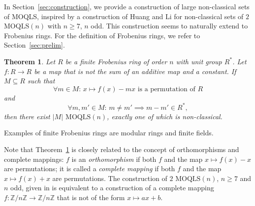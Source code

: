 \documentclass[a4paper]{article}
\newtheorem{theorem}{Theorem}
\theoremstyle{definition}
\newcommand{\FF}{\mathbb F}
\newcommand{\ZZ}{\mathbb Z}
\newcommand{\MOQLS}[1]{\(\mathrm{MOQLS}(#1)\)}
\begin{document}

In Section~\ref{sec:construction}, we provide a construction of large non-classical sets of MOQLS, inspired by a construction of Huang and Li \cite{2MOQLS7} for non-classical sets of \(2\) \MOQLS{n} with $n\geq7$, \(n\) odd. This construction seems to naturally extend to Frobenius rings. For the definition of Frobenius rings, we refer to Section~\ref{sec:prelim}.


\begin{theorem}\label{thm:construction}
    Let \(R\) be a finite Frobenius ring of order \(n\) with unit group \(R^*\). Let \(f:R\to R\) be a map that is not the sum of an additive map and a constant. If \(M\subseteq R\) such that \[\forall m\in M\colon\,x\mapsto f(x)-mx \text{ is a permutation of }R\] and \[\forall m,m'\in M\colon\,m\neq m'\implies m-m'\in R^*,\] then there exist \(|M|\) \MOQLS{n}, exactly one of which is non-classical.
\end{theorem}

Examples of finite Frobenius rings are modular rings and finite fields.

Note that Theorem~\ref{thm:construction} is closely related to the concept of orthomorphisms and complete mappings: \(f\) is an \emph{orthomorphism} if both \(f\) and the map \(x\mapsto f(x)-x\) are permutations; it is called a \emph{complete mapping} if both \(f\) and the map \(x\mapsto f(x)+x\) are permutations. The construction of \(2\) \MOQLS{n}, \(n\geq7\) and \(n\) odd, given in \cite{2MOQLS7} is equivalent to a construction of a complete mapping \(f:\ZZ/n\ZZ\to\ZZ/n\ZZ\) that is not of the form \(x\mapsto ax+b\).
\end{document}
